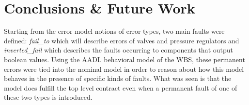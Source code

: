\section{Conclusions \& Future Work}
Starting from the error model notions of error types, two main faults were defined: \textit{fail\_to} which will describe errors of valves and pressure regulators and \textit{inverted\_fail} which describes the faults occurring to components that output boolean values. Using the AADL behavioral model of the WBS, these permanent errors were tied into the nominal model in order to reason about how this model behaves in the presence of specific kinds of faults. What was seen is that the model does fulfill the top level contract even when a permanent fault of one of these two types is introduced. 




